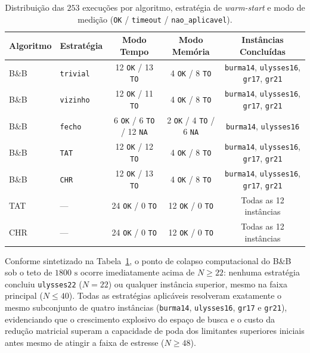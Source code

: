 \documentclass[12pt]{article}
\begin{document}
\begin{table}[ht]
\centering
\caption{Distribuição das $253$ execuções por algoritmo, estratégia de \textit{warm-start} e modo de medição (\texttt{OK} / \texttt{timeout} / \texttt{nao\_aplicavel}).}
\label{tab:status_execucoes}
\small
\begin{tabular}{llccc}
\toprule
\textbf{Algoritmo} & \textbf{Estratégia} & \textbf{Modo Tempo} & \textbf{Modo Memória} & \textbf{Instâncias Concluídas} \\
\midrule
B\&B & \texttt{trivial} & 12 \texttt{OK} / 13 \texttt{TO} & 4 \texttt{OK} / 8 \texttt{TO} & \texttt{burma14}, \texttt{ulysses16}, \texttt{gr17}, \texttt{gr21} \\
B\&B & \texttt{vizinho} & 12 \texttt{OK} / 11 \texttt{TO} & 4 \texttt{OK} / 8 \texttt{TO} & \texttt{burma14}, \texttt{ulysses16}, \texttt{gr17}, \texttt{gr21} \\
B\&B & \texttt{fecho}   & 6 \texttt{OK} / 6 \texttt{TO} / 12 \texttt{NA} & 2 \texttt{OK} / 4 \texttt{TO} / 6 \texttt{NA} & \texttt{burma14}, \texttt{ulysses16} \\
B\&B & \texttt{TAT}     & 12 \texttt{OK} / 12 \texttt{TO} & 4 \texttt{OK} / 8 \texttt{TO} & \texttt{burma14}, \texttt{ulysses16}, \texttt{gr17}, \texttt{gr21} \\
B\&B & \texttt{CHR}     & 12 \texttt{OK} / 13 \texttt{TO} & 4 \texttt{OK} / 8 \texttt{TO} & \texttt{burma14}, \texttt{ulysses16}, \texttt{gr17}, \texttt{gr21} \\
\midrule
TAT  & ---              & 24 \texttt{OK} / 0 \texttt{TO}  & 12 \texttt{OK} / 0 \texttt{TO} & Todas as 12 instâncias \\
CHR  & ---              & 24 \texttt{OK} / 0 \texttt{TO}  & 12 \texttt{OK} / 0 \texttt{TO} & Todas as 12 instâncias \\
\bottomrule
\end{tabular}
\end{table}

Conforme sintetizado na Tabela~\ref{tab:status_execucoes}, o ponto de colapso computacional do B\&B sob o teto de $1800\text{ s}$ ocorre imediatamente acima de $N \geq 22$: nenhuma estratégia concluiu \texttt{ulysses22} ($N=22$) ou qualquer instância superior, mesmo na faixa principal ($N \le 40$). Todas as estratégias aplicáveis resolveram exatamente o mesmo subconjunto de quatro instâncias (\texttt{burma14}, \texttt{ulysses16}, \texttt{gr17} e \texttt{gr21}), evidenciando que o crescimento explosivo do espaço de busca e o custo da redução matricial superam a capacidade de poda dos limitantes superiores iniciais antes mesmo de atingir a faixa de estresse ($N \ge 48$).
\end{document}
